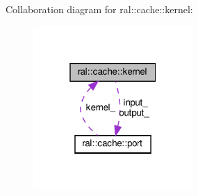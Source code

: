 Collaboration diagram for ral\+:\+:cache\+:\+:kernel\+:\nopagebreak
\begin{figure}[H]
\begin{center}
\leavevmode
\includegraphics[width=172pt]{classral_1_1cache_1_1kernel__coll__graph}
\end{center}
\end{figure}
